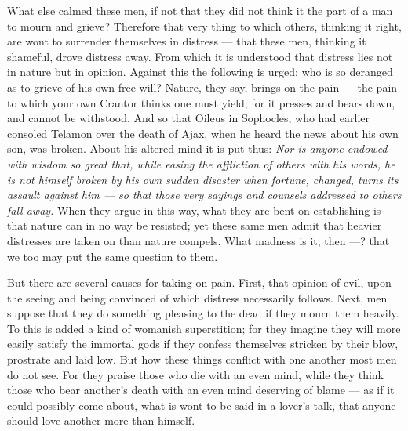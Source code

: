  What else calmed these men, if not that they did not think it the part of a man to mourn and grieve? Therefore that very thing to which others, thinking it right, are wont to surrender themselves in distress — that these men, thinking it shameful, drove distress away. From which it is understood that distress lies not in nature but in opinion. Against this the following is urged: who is so deranged as to grieve of his own free will? Nature, they say, brings on the pain — the pain to which your own Crantor thinks one must yield; for it presses and bears down, and cannot be withstood. And so that Oileus in Sophocles, who had earlier consoled Telamon over the death of Ajax, when he heard the news about his own son, was broken. About his altered mind it is put thus: \textit{Nor is anyone endowed with wisdom so great that, while easing the affliction of others with his words, he is not himself broken by his own sudden disaster when fortune, changed, turns its assault against him — so that those very sayings and counsels addressed to others fall away.} When they argue in this way, what they are bent on establishing is that nature can in no way be resisted; yet these same men admit that heavier distresses are taken on than nature compels. What madness is it, then —? that we too may put the same question to them.

 But there are several causes for taking on pain. First, that opinion of evil, upon the seeing and being convinced of which distress necessarily follows. Next, men suppose that they do something pleasing to the dead if they mourn them heavily. To this is added a kind of womanish superstition; for they imagine they will more easily satisfy the immortal gods if they confess themselves stricken by their blow, prostrate and laid low. But how these things conflict with one another most men do not see. For they praise those who die with an even mind, while they think those who bear another's death with an even mind deserving of blame — as if it could possibly come about, what is wont to be said in a lover's talk, that anyone should love another more than himself.

